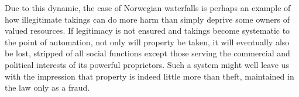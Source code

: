 Due to this dynamic, the case of Norwegian waterfalls is perhaps an example of how illegitimate takings can do more harm than simply deprive some owners of valued resources. If legitimacy is not ensured and takings become systematic to the point of automation, not only will property be taken, it will eventually also be lost, stripped of all social functions except those serving the commercial and political interests of its powerful proprietors. Such a system might well leave us with the impression that property is indeed little more than theft, maintained in the law only as a fraud.



